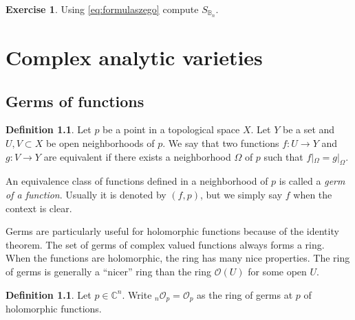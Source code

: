 \documentclass[12pt,openany]{book}
\newcommand{\C}{{\mathbb{C}}}
\newcommand{\bB}{{\mathbb{B}}}
\newcommand{\sO}{{\mathcal{O}}}
\newcommand{\myindex}[1]{#1\index{#1}}
\theoremstyle{plain}
\theoremstyle{remark}
\theoremstyle{definition}
\newtheorem{defn}[thm]{Definition}
\newenvironment{exbox}{%
    \def\FrameCommand{\vrule width 1pt \relax\hspace {10pt}}%
    \MakeFramed {\advance \hsize -\width \FrameRestore }%
}{%
    \endMakeFramed
}
\theoremstyle{exercise}
\newtheorem{exercise}{Exercise}[section]
\theoremstyle{example}
\begin{document}
\begin{exbox}
\begin{exercise}
Using \eqref{eq:formulaszego} compute $S_{\bB_n}$.
\end{exercise}
\end{exbox}

%
%
%
%


\chapter{Complex analytic varieties} \label{ch:analyticvarieties}


\section{Germs of functions}

\begin{defn}
Let $p$ be a point in a topological space $X$.  Let $Y$ be a set and
$U, V \subset X$ be open neighborhoods of $p$.  We say that
two functions $f \colon U \to Y$ and
$g \colon V \to Y$ are equivalent if there exists a neighborhood
$\Omega$ of $p$ such that $f|_\Omega = g|_\Omega$.

An equivalence class of functions defined in a neighborhood of $p$
is called a \emph{\myindex{germ of a function}}.
Usually it is denoted by $(f,p)$, but we simply say $f$ when
the context is clear.
\end{defn}

Germs are particularly useful for holomorphic functions because of the identity
theorem.  The set of germs of complex valued functions always forms a ring.
When the functions are holomorphic, the ring has many nice properties.
The ring of germs is generally a ``nicer'' ring than the ring $\sO(U)$ for
some open $U$.

\begin{defn}
Let $p \in \C^n$.  Write
${}_n\sO_p = \sO_p$ as the ring of germs at $p$ of holomorphic functions.
\end{defn}
\end{document}
